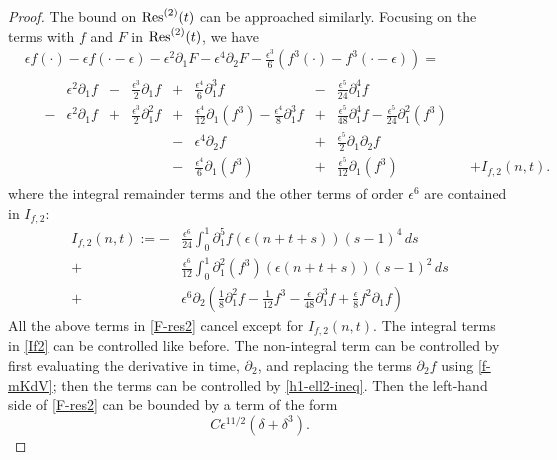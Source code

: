 \begin{proof}
	The bound on \(\mathrm{Res}^{(2)}(t)\) can be approached similarly. Focusing on the terms with \(f\) and \(F\) in \(\mathrm{Res}^{(2)}(t)\), we have 
	\begin{equation}\label{F-res2}
		\begin{aligned}
			&\epsilon f(\cdot) - \epsilon f(\cdot - \epsilon) - \epsilon^2 \partial_1 F -\epsilon^4\partial_2 F - \frac{\epsilon^3} 6 (f^3(\cdot) - f^3(\cdot - \epsilon)) =\\
			&\quad \begin{aligned}
				&\epsilon^2\partial_1 f &- &\frac{\epsilon^3} 2 \partial_1 f &+ &\frac{\epsilon^4} 6 \partial_1^3f & - & \frac{\epsilon^5}{24} \partial_1^4 f\\
				-&\epsilon^2\partial_1 f & + & \frac{\epsilon^3} 2 \partial_1^2 f &+& \frac{\epsilon^4}{12} \partial_1(f^3) - \frac{\epsilon^4} 8 \partial_1^3 f & + &  \frac{\epsilon^5}{48} \partial_1^4 f - \frac{\epsilon^5}{24}\partial_1^2(f^3)\\
				&&&& -&\epsilon^4 \partial_2 f & + & \frac{\epsilon^5} 2 \partial_1 \partial_2 f\\
				&&&& -&\frac{\epsilon^4} 6 \partial_1(f^3) & + & \frac{\epsilon^5}{12} \partial_1(f^3) & &+ I_{f,2}(n,t).
			\end{aligned}
		\end{aligned}
	\end{equation}
	where the integral remainder terms and the other terms of order \(\epsilon^6\) are contained in \(I_{f,2}\):
	\begin{equation}\label{If2}
	\begin{aligned}
		I_{f,2}(n,t) := - & \frac{\epsilon^6} {24} \int_{0}^1 \partial_1^5 f (\epsilon(n+t+s))(s-1)^4\, ds \\
		+ & \frac{\epsilon^6} {12} \int_0^1 \partial_1^2(f^3)(\epsilon(n+t+s))(s-1)^2\, ds \\
		+ & \epsilon^6\partial_2\left(\frac{1} 8 \partial_1^2 f - \frac{1}{12} f^3  - \frac{\epsilon}{48} \partial_1^3 f + \frac{\epsilon} 8 f^2 \partial_1 f\right)
	\end{aligned}
	\end{equation}
	All the above terms in \cref{F-res2} cancel except for \(I_{f,2}(n,t)\). The integral terms in \cref{If2} can be controlled like before. The non-integral term can be controlled by first evaluating the derivative in time, \(\partial_2\), and replacing the terms \(\partial_2 f\) using \cref{f-mKdV}; then the terms can be controlled by \cref{h1-ell2-ineq}. Then the left-hand side of \cref{F-res2} can be bounded by a term of the form \[ C \epsilon^{11/2}(\delta + \delta^3).\]


\end{proof}
